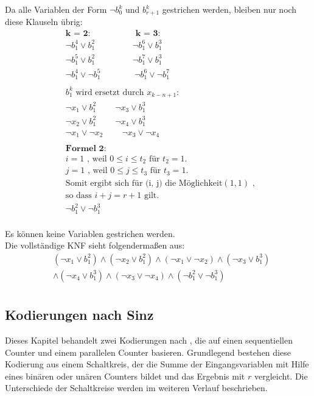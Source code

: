 \documentclass[a4,abstract=on]{scrartcl}
\begin{document}
Da alle Variablen der Form $\neg b_0^k$ und $b_{r+1}^k$  gestrichen werden, bleiben nur noch diese Klauseln übrig:\\
\begin{align*}
&\textbf{k = 2:} {~~~~~~~~~~~~~~~~~~~~~~~~} \textbf{k = 3:}\\
&\neg b_1^4  \vee b_1^2 {~~~~~~~~~~~~~~~~~~~~}\neg b_1^6 \vee b_1^3\\
&\neg b_1^5 \vee b_1^2  {~~~~~~~~~~~~~~~~~~~~}\neg b_1^7 \vee b_1^3\\
&\neg b_1^4 \vee \neg b_1^5 {~~~~~~~~~~~~~~~~~~}\neg b_1^6 \vee \neg b_1^7\\
\\
&b_1^k \text{ wird ersetzt durch } x_{k-n+1}:\\
&\neg x_1 \vee b_1^2 {~~~~~~~~~~} \neg x_3 \vee b_1^3\\
&\neg x_2 \vee b_1^2 {~~~~~~~~~~} \neg x_4 \vee b_1^3\\
&\neg x_1 \vee \neg x_2 {~~~~~~~~~~} \neg x_3 \vee \neg x_4\\
\\
&\textbf{Formel 2:}\\
&i=1 \text{ , weil } 0\leq i \leq t_2 \text{ für } t_2 = 1.\\
&j=1 \text{ , weil } 0\leq j \leq t_3 \text{ für } t_3=1.\\
&\text{Somit ergibt sich für (i, j) die Möglichkeit} (1,1) \text{ , }\\
&\text{so dass } i+j = r+1 \text{  gilt.}\\
&\neg b_1^2 \vee \neg b_1^3\\
\end{align*}

Es können keine Variablen gestrichen werden.\\

Die vollständige KNF sieht folgendermaßen aus:\\
\begin{align*}
&(\neg x_1 \vee b_1^2) \wedge (\neg x_2 \vee b_1^2) \wedge (\neg x_1 \vee \neg x_2) \wedge (\neg x_3 \vee b_1^3)\\
&\wedge (\neg x_4 \vee b_1^3) \wedge (\neg x_3 \vee \neg x_4) \wedge (\neg b_1^2 \vee \neg b_1^3)\\
\end{align*}

	\subsection{Kodierungen nach Sinz}
Dieses Kapitel behandelt zwei Kodierungen nach \cite[][]{sinz}, die auf einen sequentiellen Counter und einem parallelen Counter basieren. Grundlegend bestehen diese Kodierung aus einem Schaltkreis, der die Summe der Eingangsvariablen mit Hilfe eines binären oder unären Counters bildet und das Ergebnis mit $r$ vergleicht. Die Unterschiede der Schaltkreise werden im weiteren Verlauf beschrieben.
\end{document}
